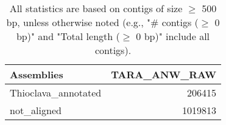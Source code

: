 \documentclass[12pt,a4paper]{article}
\begin{document}
\begin{table}[ht]
\begin{center}
\caption{All statistics are based on contigs of size $\geq$ 500 bp, unless otherwise noted (e.g., "\# contigs ($\geq$ 0 bp)" and "Total length ($\geq$ 0 bp)" include all contigs).}
\begin{tabular}{|l*{1}{|r}|}
\hline
Assemblies & TARA\_ANW\_RAW \\ \hline
Thioclava\_annotated & 206415 \\ \hline
not\_aligned & 1019813 \\ \hline
\end{tabular}
\end{center}
\end{table}
\end{document}
